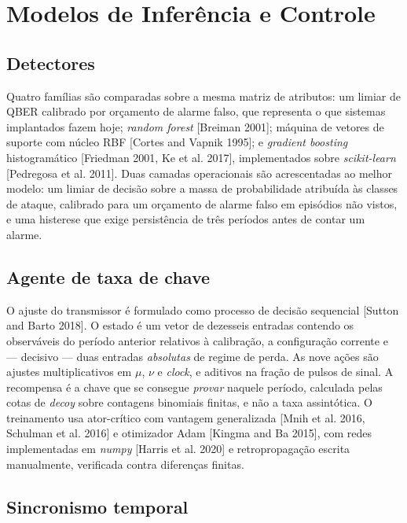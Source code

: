 \documentclass[12pt]{article}
\begin{document}
\section{Modelos de Inferência e Controle}

\subsection{Detectores}

Quatro famílias são comparadas sobre a mesma matriz de atributos: um limiar de
QBER calibrado por orçamento de alarme falso, que representa o que sistemas
implantados fazem hoje; \emph{random forest} [Breiman 2001]; máquina de vetores de
suporte com núcleo RBF [Cortes and Vapnik 1995]; e \emph{gradient boosting}
histogramático [Friedman 2001, Ke et al. 2017], implementados sobre
\emph{scikit-learn} [Pedregosa et al. 2011]. Duas camadas operacionais são
acrescentadas ao melhor modelo: um limiar de decisão sobre a massa de
probabilidade atribuída às classes de ataque, calibrado para um orçamento de
alarme falso em episódios não vistos, e uma histerese que exige persistência de
três períodos antes de contar um alarme.

\subsection{Agente de taxa de chave}

O ajuste do transmissor é formulado como processo de decisão sequencial
[Sutton and Barto 2018]. O estado é um vetor de dezesseis entradas contendo os
observáveis do período anterior relativos à calibração, a configuração corrente e
--- decisivo --- duas entradas \emph{absolutas} de regime de perda. As nove ações
são ajustes multiplicativos em $\mu$, $\nu$ e \emph{clock}, e aditivos na fração
de pulsos de sinal. A recompensa é a chave que se consegue \emph{provar} naquele
período, calculada pelas cotas de \emph{decoy} sobre contagens binomiais finitas,
e não a taxa assintótica. O treinamento usa ator-crítico com vantagem
generalizada [Mnih et al. 2016, Schulman et al. 2016] e otimizador Adam
[Kingma and Ba 2015], com redes implementadas em \emph{numpy}
[Harris et al. 2020] e retropropagação escrita manualmente, verificada contra
diferenças finitas.

\subsection{Sincronismo temporal}
\end{document}
